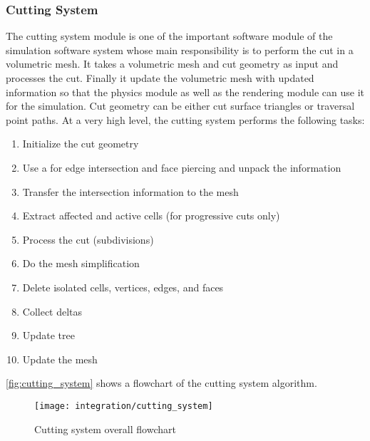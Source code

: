 \subsubsection{Cutting System}\label{sec:cutting_system}
The cutting system module is one of the important software module of the simulation software system whose main responsibility is to perform the cut in a volumetric mesh. It takes a volumetric mesh and cut geometry as input and processes the cut. Finally it update the volumetric mesh with updated information so that the physics  module as well as the rendering module can use it for the simulation. Cut geometry can be either cut surface triangles or traversal point paths. At a very high level, the cutting system performs the following tasks:
\begin{enumerate}
  \item Initialize the cut geometry
  \item Use a  for edge intersection and face piercing and unpack the information
  \item Transfer the intersection information to the mesh
  \item Extract affected and active cells (for progressive cuts only) \item Process the cut (subdivisions)
  \item Do the mesh simplification
  \item Delete isolated cells, vertices, edges, and faces
  \item Collect deltas
  \item Update  tree
  \item Update the mesh
\end{enumerate}

\autoref{fig:cutting_system} shows a flowchart of the cutting system algorithm.
\begin{figure}
  \centering
  \texttt{[image: integration/cutting\_system]}
  \caption{Cutting system overall flowchart}\label{fig:cutting_system}
\end{figure}

